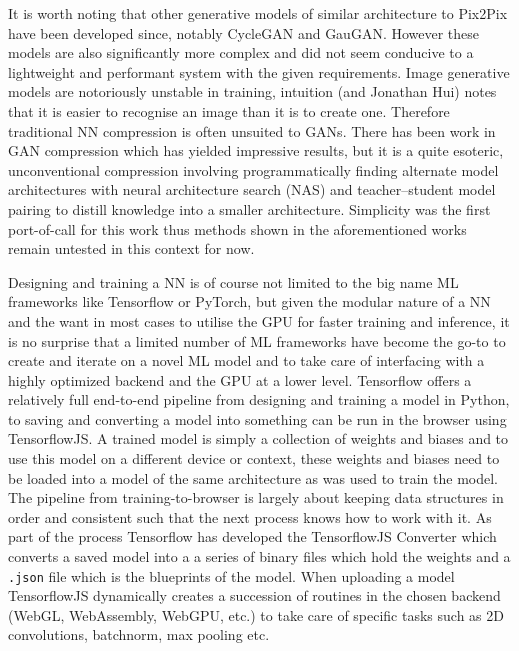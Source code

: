 \documentclass{article}
\begin{document}
It is worth noting that other generative models of similar architecture to Pix2Pix have been developed since, notably CycleGAN\cite{1703.10593} and GauGAN\cite{1903.07291}. However these models are also significantly more complex and did not seem conducive to a lightweight and performant system with the given requirements. Image generative models are notoriously unstable in training, intuition (and Jonathan Hui) notes that it is easier to recognise an image than it is to create one\cite{hard_to_train_gans}. Therefore traditional NN compression\cite{2006.03669} is often unsuited to GANs. There has been work in GAN compression which has yielded impressive results, but it is a quite esoteric, unconventional compression involving programmatically finding alternate model architectures with neural architecture search (NAS) and teacher--student model pairing to distill knowledge into a smaller architecture\cite{2003.08936}. Simplicity was the first port-of-call for this work thus methods shown in the aforementioned works remain untested in this context for now.

Designing and training a NN is of course not limited to the big name ML frameworks like Tensorflow\cite{tf} or PyTorch\cite{pytorch}, but given the modular nature of a NN and the want in most cases to utilise the GPU for faster training and inference, it is no surprise that a limited number of ML frameworks have become the go-to to create and iterate on a novel ML model and to take care of interfacing with a highly optimized backend and the GPU at a lower level. Tensorflow offers a relatively full end-to-end pipeline from designing and training a model in Python, to saving and converting a model into something can be run in the browser using TensorflowJS\cite{tfjs}. A trained model is simply a collection of weights and biases and to use this model on a different device or context, these weights and biases need to be loaded into a model of the same architecture as was used to train the model. The pipeline from training-to-browser is largely about keeping data structures in order and consistent such that the next process knows how to work with it. As part of the process Tensorflow has developed the TensorflowJS Converter\cite{tfjs_converter} which converts a saved model into a a series of binary files which hold the weights and a \verb|.json| file which is the blueprints of the model. When uploading a model TensorflowJS dynamically creates a succession of routines in the chosen backend (WebGL, WebAssembly, WebGPU, etc.) to take care of specific tasks such as 2D convolutions, batchnorm, max pooling etc.%
\end{document}

